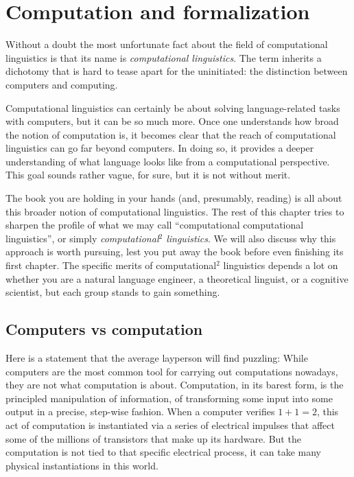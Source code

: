 \chapter{Computation and formalization}
\label{cha:Formal}

Without a doubt the most unfortunate fact about the field of computational linguistics is that its name is \emph{computational linguistics}.
The term inherits a dichotomy that is hard to tease apart for the uninitiated: the distinction between computers and computing.

Computational linguistics can certainly be about solving language-related tasks with computers, but it can be so much more.
Once one understands how broad the notion of computation is, it becomes clear that the reach of computational linguistics can go far beyond computers.
In doing so, it provides a deeper understanding of what language looks like from a computational perspective.
This goal sounds rather vague, for sure, but it is not without merit.

The book you are holding in your hands (and, presumably, reading) is all about this broader notion of computational linguistics.
The rest of this chapter tries to sharpen the profile of what we may call ``computational computational linguistics'', or simply \emph{computational$^2$ linguistics}.
We will also discuss why this approach is worth pursuing, lest you put away the book before even finishing its first chapter.
The specific merits of computational$^2$ linguistics depends a lot on whether you are a natural language engineer, a theoretical linguist, or a cognitive scientist, but each group stands to gain something.


\section{Computers vs computation}

Here is a statement that the average layperson will find puzzling:
While computers are the most common tool for carrying out computations nowadays, they are not what computation is about.
Computation, in its barest form, is the principled manipulation of information, of transforming some input into some output in a precise, step-wise fashion.
When a computer verifies $1 + 1 = 2$, this act of computation is instantiated via a series of electrical impulses that affect some of the millions of transistors that make up its hardware.
But the computation is not tied to that specific electrical process, it can take many physical instantiations in this world.

